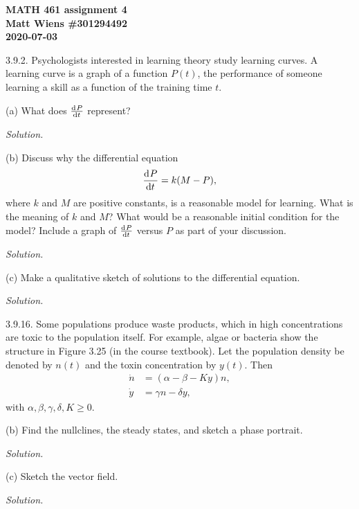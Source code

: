 \documentclass{article}
\begin{document}
\textbf{MATH 461 assignment 4} \\
\textbf{Matt Wiens \#301294492} \\
\textbf{2020-07-03}

3.9.2. Psychologists interested in learning theory study learning
curves. A learning curve is a graph of a function $P(t)$, the
performance of someone learning a skill as a function of the training
time $t$.

(a) What does $\od{P}{t}$ represent?

\textit{Solution.}

\vspace{5mm}

(b) Discuss why the differential equation
%
\begin{equation*}
    \dod{P}{t} = k (M - P),
\end{equation*}
%
where $k$ and $M$ are positive constants, is a reasonable model for
learning. What is the meaning of $k$ and $M$? What would be a reasonable
initial condition for the model? Include a graph of $\od{P}{t}$ versus
$P$ as part of your discussion.

\textit{Solution.}

\vspace{5mm}

(c) Make a qualitative sketch of solutions to the differential equation.

\textit{Solution.}

\newpage

3.9.16. Some populations produce waste products, which in high concentrations are
toxic to the population itself. For example, algae or bacteria show the structure
in Figure 3.25 (in the course textbook). Let the population density be denoted
by $n(t)$ and the toxin concentration by $y(t)$. Then
%
\begin{align*}
    \dot{n} &= (\alpha - \beta - K y) n, \\
    \dot{y} &= \gamma n - \delta y,
\end{align*}
%
with $\alpha, \beta, \gamma, \delta, K \geq 0$.

(b) Find the nullclines, the steady states, and sketch a phase portrait.

\textit{Solution.}

\vspace{5mm}

(c) Sketch the vector field.

\textit{Solution.}

\vspace{5mm}
\end{document}
